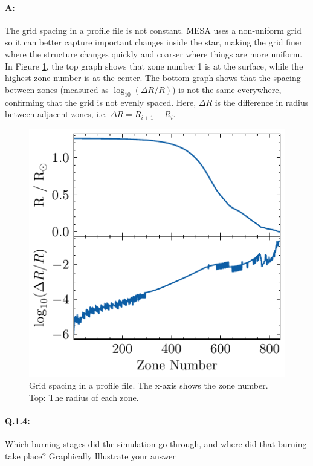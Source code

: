 \documentclass[twocolumn,fontsize=11pt]{scrartcl}
\begin{document}
\paragraph{A:} The grid spacing in a profile file is not constant. MESA uses a non-uniform grid so it can better capture important changes inside the star, making the grid finer where the structure changes quickly and coarser where things are more uniform. In Figure \ref{fig:grid_spacing}, the top graph shows that zone number 1 is at the surface, while the highest zone number is at the center. The bottom graph shows that the spacing between zones (measured as \(\log_{10}(\Delta R / R)\)) is not the same everywhere, confirming that the grid is not evenly spaced. Here, \(\Delta R\) is the difference in radius between adjacent zones, i.e. \(\Delta R = R_{i+1} - R_i\).
%
\begin{figure}[htbp]
    \centering
    \includegraphics{R_vs_zone.pdf}
    \caption{Grid spacing in a profile file. The x-axis shows the zone number. Top: The radius of each zone.}
    \label{fig:grid_spacing}
\end{figure}
%
\paragraph{Q.1.4:} Which burning stages did the simulation go through, and where did that burning take
place? Graphically Illustrate your answer
\end{document}
